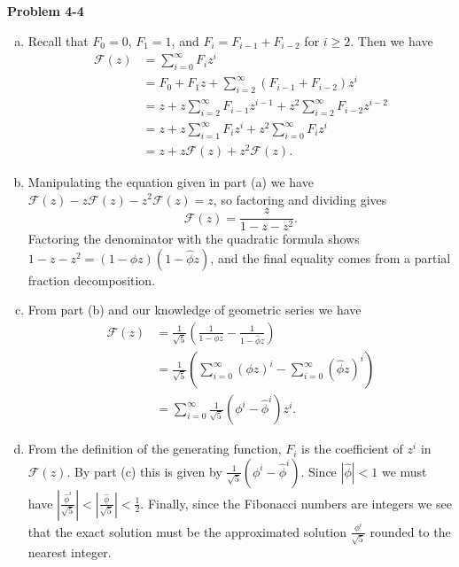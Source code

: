 \documentclass{article}
\begin{document}
\noindent\textbf{Problem 4-4}\\
\begin{enumerate}[a.]
\item Recall that $F_0 = 0$, $F_1 = 1$, and $F_i = F_{i-1} + F_{i-2}$ for $i \geq 2$.  Then we have
\begin{align*}
\mathcal{F}(z) &= \sum_{i=0}^\infty F_i z^i \\
&= F_0 + F_1z + \sum_{i=2}^\infty (F_{i-1} + F_{i-2})z^i \\
&= z + z\sum_{i=2}^\infty F_{i-1}z^{i-1} + z^2\sum_{i=2}^\infty F_{i-2}z^{i-2} \\
&= z + z\sum_{i=1}^\infty F_{i}z^{i} + z^2\sum_{i=0}^\infty F_{i}z^{i} \\
&= z + z\mathcal{F}(z) + z^2\mathcal{F}(z).
\end{align*}

\item Manipulating the equation given in part (a) we have $\mathcal{F}(z) - z\mathcal{F}(z) - z^2\mathcal{F}(z) = z$, so factoring and dividing gives 
\[ \mathcal{F}(z) = \frac{z}{1-z-z^2}.\]
Factoring the denominator with the quadratic formula shows $1 - z - z^2 = (1-\phi z)(1 - \hat{\phi} z)$, and the final equality comes from a partial fraction decomposition. \\

\item From part (b) and our knowledge of geometric series we have
\begin{align*}
 \mathcal{F}(z) &= \frac{1}{\sqrt{5}}\left(\frac{1}{1-\phi z} - \frac{1}{1-\hat{\phi}z}\right) \\
&= \frac{1}{\sqrt{5}}\left(\sum_{i=0}^\infty (\phi z)^i - \sum_{i=0}^\infty (\hat{\phi}z)^i \right) \\
&=\sum_{i=0}^\infty  \frac{1}{\sqrt{5}} (\phi^i - \hat{\phi}^i)z^i.
\end{align*}

\item From the definition of the generating function, $F_i$ is the coefficient of $z^i$ in $\mathcal{F}(z)$.  By part (c) this is given by $\frac{1}{\sqrt{5}} (\phi^i - \hat{\phi}^i)$. Since $|\hat{\phi}| < 1$ we must have $| \frac{\hat{\phi}^i}{\sqrt{5}} | < | \frac{\hat{\phi}}{\sqrt{5}} | < \frac{1}{2}$.  Finally, since the Fibonacci numbers are integers we see that the exact solution must be the approximated solution $\frac{\phi^i}{\sqrt{5}}$ rounded to the nearest integer. \\
\end{enumerate}
\end{document}
